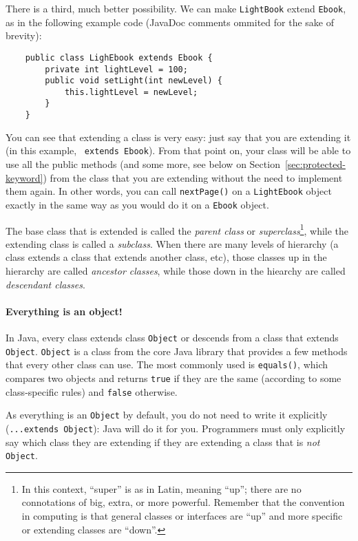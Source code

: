 There is a third, much better possibility. We can make
\verb+LightBook+ extend \verb+Ebook+, as in the following example code 
(JavaDoc comments ommited for the sake of brevity): 

\begin{verbatim}
    public class LighEbook extends Ebook {
        private int lightLevel = 100;
        public void setLight(int newLevel) {
            this.lightLevel = newLevel;
        }
    }
\end{verbatim}

You can see that extending a class is very easy: just say that you are
extending it (in this example, ~\verb+extends Ebook+).
From that point on, your class will be able to use all the public methods (and
some more, see below on Section~\ref{sec:protected-keyword}) from
the class that you are extending without the need to implement them
again. In other words, you can call \verb+nextPage()+ on a
\verb+LightEbook+ object exactly in the same way as you would do it
on a \verb+Ebook+ object. 

The base class that is extended is called the \emph{parent class} or
\emph{superclass}\footnote{In this context, ``super'' is as in Latin,
  meaning ``up''; there are no connotations of big, extra, or more
  powerful. Remember that the convention in computing is that general
  classes or interfaces are ``up'' and more specific or extending classes
  are ``down''.}, 
while the extending class is called a \emph{subclass}. When there are
many levels of hierarchy (a class extends a class that extends another
class, etc), those classes up in the hierarchy are called
\emph{ancestor classes}, while those down in the hiearchy are called
\emph{descendant classes}. 

\paragraph{Everything is an object!}
\label{sec:everything-an-object}

In Java, every class extends class \verb+Object+ or descends from a
class that extends \verb+Object+. \verb+Object+ is a class from the
core Java library that provides a few methods that every other class
can use. The most commonly used is \verb+equals()+, which compares two
objects and returns \verb+true+ if they are the same (according to
some class-specific rules) and \verb+false+ otherwise. 

As everything is an \verb+Object+ by default, you do not need to write
it explicitly (\verb+...extends Object+): Java will do it for
you. Programmers must only explicitly say which class they are
extending if they are extending a class that is \emph{not} \verb+Object+.

